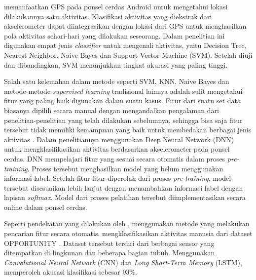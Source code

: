 \Textcite{Chiang-201413} memanfaatkan GPS pada ponsel cerdas Android untuk mengetahui lokasi dilakukannya satu aktivitas. Klasifikasi aktivitas yang diekstrak dari akselerometer dapat diintegrasikan dengan lokasi dari GPS untuk menghasilkan pola aktivitas sehari-hari yang dilakukan seseorang. Dalam penelitian ini digunakan empat jenis \textit{classifier} untuk mengenali aktivitas, yaitu Decision Tree, Nearest Neighbor, Naive Bayes dan Support Vector Machine (SVM). Setelah diuji dan dibandingkan, SVM menunjukkan tingkat akurasi yang paling tinggi.

Salah satu kelemahan dalam metode seperti SVM, KNN, Naive Bayes dan metode-metode \textit{supervised learning} tradisional lainnya adalah sulit mengetahui fitur yang paling baik digunakan dalam suatu kasus. Fitur dari suatu set data biasanya dipilih secara manual dengan mengandalkan pengalaman dari penelitian-penelitian yang telah dilakukan sebelumnya, sehingga bisa saja fitur tersebut tidak memiliki kemampuan yang baik untuk membedakan berbagai jenis aktivitas \Parencite{zhang-2015}. Dalam penelitiannya \citeauthor{zhang-2015} menggunakan Deep Neural Network (DNN) untuk mengklasifikasikan aktivitas berdasarkan akselerometer pada ponsel cerdas. DNN mempelajari fitur yang sesuai secara otomatis dalam proses \textit{pre-training}. Proses tersebut menghasilkan model yang belum menggunakan informasi label. Setelah fitur-fitur diperolah dari proses \textit{pre-training}, model tersebut disesuaikan lebih lanjut dengan menambahkan informasi label dengan lapisan \textit{softmax}. Model dari proses pelatihan tersebut diimplementasikan secara online dalam ponsel cerdas.

Seperti pendekatan yang dilakukan oleh \citeauthor{zhang-2015}, \Textcite{ordonez-2016} menggunakan metode yang melakukan pencarian fitur secara otomatis. \citeauthor{ordonez-2016} mengklasifikasikan aktivitas manusia dari dataset OPPORTUNITY \Parencite{roggen-2010}. Dataset tersebut terdiri dari berbagai sensor yang ditempatkan di lingkunan dan beberapa bagian tubuh. Menggunakan \textit{Convolutional Neural Network} (CNN) dan \textit{Long Short-Term Memory} (LSTM), \citeauthor{ordonez-2016} memperoleh akurasi klasifikasi sebesar 93\%.

